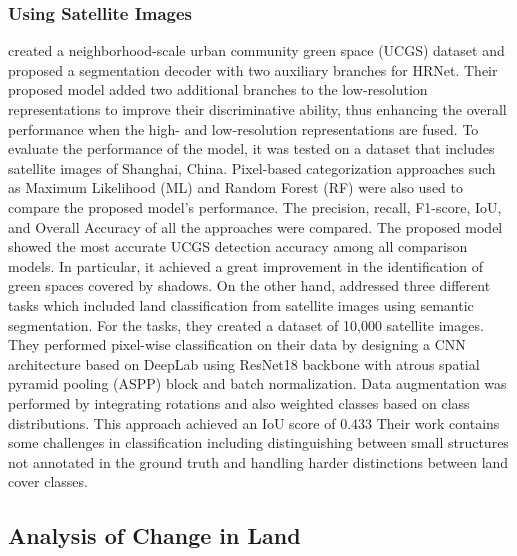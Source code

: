 \subsubsection{Using Satellite Images}
  created a neighborhood-scale
urban community green space (UCGS) dataset and proposed a segmentation decoder with
two auxiliary branches for HRNet. Their proposed model added
two additional branches to the low-resolution representations 
to improve their discriminative ability,
thus enhancing the overall performance when the high- and low-resolution representations are fused.
To evaluate the performance of the model, it was tested on a dataset that includes satellite images
of Shanghai, China.
Pixel-based
categorization approaches such as Maximum Likelihood (ML) and Random Forest (RF) were also used to compare the proposed model's performance.
The precision, recall, F1-score, IoU, and Overall Accuracy of all the approaches were compared. The proposed model showed the most accurate
UCGS detection accuracy among all comparison models. In particular, it achieved a great
improvement in the identification of green spaces covered by shadows.\newline 
On the other hand,  addressed three different tasks which included land classification from satellite images using semantic segmentation. For the tasks, they created a dataset of 10,000 satellite images.
They performed pixel-wise classification on their data by designing a CNN architecture based on DeepLab using ResNet18 backbone with
atrous spatial pyramid pooling (ASPP) block and batch normalization. Data augmentation was performed by integrating rotations and also weighted classes based on class distributions.
This approach achieved an IoU score of 0.433 %
Their work contains some challenges in classification including distinguishing between small structures not annotated in the ground truth and handling harder distinctions between land cover classes.

\subsection{Analysis of Change in Land}

